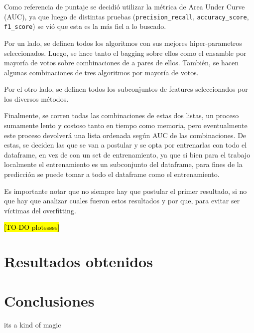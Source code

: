 \documentclass[a4paper]{article}
\begin{document}
Como referencia de puntaje se decidió utilizar la métrica de Area Under Curve (AUC), ya que luego de distintas pruebas (\texttt{precision\_recall}, \texttt{accuracy\_score}, \texttt{f1\_score}) se vió que esta es la más fiel a lo buscado.

Por un lado, se definen todos los algoritmos con sus mejores hiper-parametros seleccionados. Luego, se hace tanto el bagging sobre ellos como el ensamble por mayoría de votos sobre combinaciones de a pares de ellos. También, se hacen algunas combinaciones de tres algoritmos por mayoría de votos.

Por el otro lado, se definen todos los subconjuntos de features seleccionados por los diversos métodos.

Finalmente, se corren todas las combinaciones de estas dos listas, un proceso sumamente lento y costoso tanto en tiempo como memoria, pero eventualmente este proceso devolverá una lista ordenada según AUC de las combinaciones. De estas, se deciden las que se van a postular y se opta por entrenarlas con todo el dataframe, en vez de con un set de entrenamiento, ya que si bien para el trabajo localmente el entrenamiento es un subconjunto del dataframe, para fines de la predicción se puede tomar a todo el dataframe como el entrenamiento.

Es importante notar que no siempre hay que postular el primer resultado, si no que hay que analizar cuales fueron estos resultados y por que, para evitar ser víctimas del overfitting. 

\hl{[TO-DO plotsssss]}

\section{Resultados obtenidos}

\section{Conclusiones}
its a kind of magic
\end{document}
